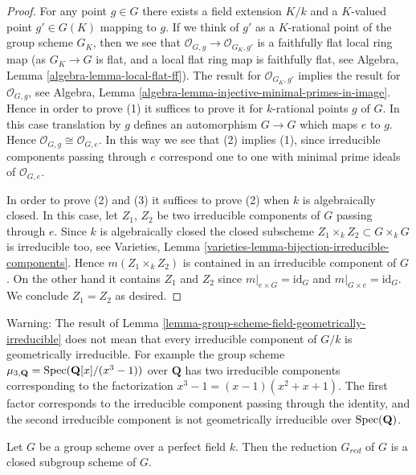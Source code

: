 \begin{proof}
For any point $g \in G$ there exists a field extension
$K/k$ and a $K$-valued point $g' \in G(K)$ mapping to
$g$. If we think of $g'$ as a $K$-rational point of the
group scheme $G_K$, then we see that
$\mathcal{O}_{G, g} \to \mathcal{O}_{G_K, g'}$ is a faithfully flat
local ring map (as $G_K \to G$ is flat, and a local flat ring map
is faithfully flat, see
Algebra, Lemma \ref{algebra-lemma-local-flat-ff}).
The result for $\mathcal{O}_{G_K, g'}$ implies the
result for $\mathcal{O}_{G, g}$, see
Algebra, Lemma \ref{algebra-lemma-injective-minimal-primes-in-image}.
Hence in order to prove (1) it suffices to
prove it for $k$-rational points $g$ of $G$. In this case
translation by $g$ defines an automorphism $G \to G$
which maps $e$ to $g$. Hence $\mathcal{O}_{G, g} \cong \mathcal{O}_{G, e}$.
In this way we see that (2) implies (1), since irreducible components
passing through $e$ correspond one to one with minimal prime ideals
of $\mathcal{O}_{G, e}$.

\medskip\noindent
In order to prove (2) and (3) it suffices to prove (2) when $k$
is algebraically closed. In this case, let $Z_1$, $Z_2$ be two
irreducible components of $G$ passing through $e$.
Since $k$ is algebraically closed the closed subscheme
$Z_1 \times_k Z_2 \subset G \times_k G$ is irreducible too, see
Varieties, Lemma \ref{varieties-lemma-bijection-irreducible-components}.
Hence $m(Z_1 \times_k Z_2)$ is contained in an irreducible
component of $G$. On the other hand it contains
$Z_1$ and $Z_2$ since $m|_{e \times G} = \text{id}_G$ and
$m|_{G \times e} = \text{id}_G$. We conclude $Z_1 = Z_2$ as desired.
\end{proof}

\begin{remark}
\label{remark-warning-group-scheme-geometrically-irreducible}
Warning: The result of
Lemma \ref{lemma-group-scheme-field-geometrically-irreducible}
does not mean that every irreducible component of $G/k$ is
geometrically irreducible. For example the group scheme
$\mu_{3, \mathbf{Q}} = \mathop{\mathrm{Spec}}(\mathbf{Q}[x]/(x^3 - 1))$
over $\mathbf{Q}$ has two irreducible components corresponding
to the factorization $x^3 - 1 = (x - 1)(x^2 + x + 1)$.
The first factor corresponds to the irreducible component
passing through the identity, and the second irreducible component
is not geometrically irreducible over $\mathop{\mathrm{Spec}}(\mathbf{Q})$.
\end{remark}

\begin{lemma}
\label{lemma-reduced-subgroup-scheme-perfect}
Let $G$ be a group scheme over a perfect field $k$.
Then the reduction $G_{red}$ of $G$ is a closed subgroup scheme of $G$.
\end{lemma}

